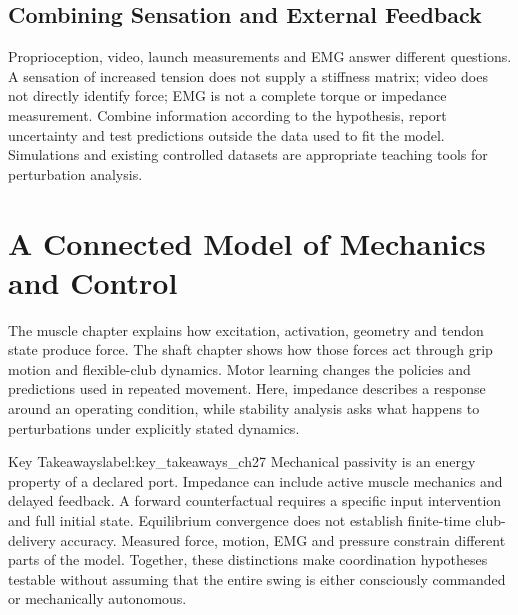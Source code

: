 \subsection{Combining Sensation and External Feedback}
\label{subsec:feedback}

Proprioception, video, launch measurements and EMG answer different questions. A sensation of increased tension does not supply a stiffness matrix; video does not directly identify force; EMG is not a complete torque or impedance measurement. Combine information according to the hypothesis, report uncertainty and test predictions outside the data used to fit the model. Simulations and existing controlled datasets are appropriate teaching tools for perturbation analysis.

\section{A Connected Model of Mechanics and Control}
\label{sec:unified}

The muscle chapter explains how excitation, activation, geometry and tendon state produce force. The shaft chapter shows how those forces act through grip motion and flexible-club dynamics. Motor learning changes the policies and predictions used in repeated movement. Here, impedance describes a response around an operating condition, while stability analysis asks what happens to perturbations under explicitly stated dynamics.

\begin{principle}{Key Takeaways}{label:key_takeaways_ch27}
Mechanical passivity is an energy property of a declared port. Impedance can include active muscle mechanics and delayed feedback. A forward counterfactual requires a specific input intervention and full initial state. Equilibrium convergence does not establish finite-time club-delivery accuracy. Measured force, motion, EMG and pressure constrain different parts of the model. Together, these distinctions make coordination hypotheses testable without assuming that the entire swing is either consciously commanded or mechanically autonomous.
\end{principle}

